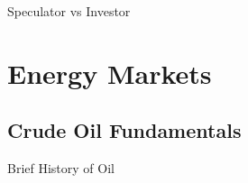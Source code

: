 \documentclass[10pt]{article}
\begin{document}
    \begin{core}{Speculator vs Investor}


    \end{core}


\section{Energy Markets}

  \subsection{Crude Oil Fundamentals}

    \begin{core}{Brief History of Oil}




    \end{core}
\end{document}
